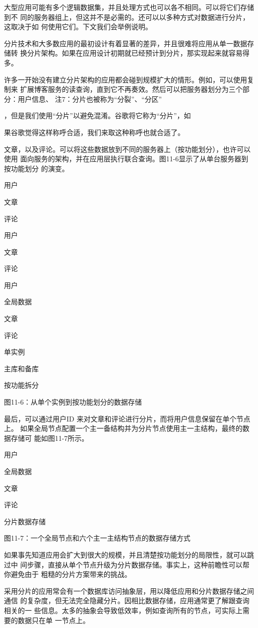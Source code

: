 大型应用可能有多个逻辑数据集，并且处理方式也可以各不相同。可以将它们存储到不
同的服务器组上，但这并不是必需的。还可以以多种方式对数据进行分片，这取决于如
何使用它们。下文我们会举例说明。

分片技术和大多数应用的最初设计有着显著的差异，并且很难将应用从单一数据存储转
换分片架构。如果在应用设计初期就已经预计到分片，那实现起来就容易得多。

许多一开始没有建立分片架构的应用都会碰到规模扩大的情形。例如，可以使用复制来
扩展博客服务的读查询，直到它不再奏效。然后可以把服务器划分为三个部分：用户信息、
注7：分片也被称为“分裂”、“分区”

，但是我们使用“分片”以避免混淆。谷歌将它称为“分片”，如

果谷歌觉得这样称呼合适，我们来取这种称呼也就合适了。

文章，以及评论。可以将这些数据放到不同的服务器上（按功能划分），也许可以使用
面向服务的架构，并在应用层执行联合查询。图11-6显示了从单台服务器到按功能划分
的演变。

用户

文章

评论

用户

文章

评论

用户

全局数据

文章

评论

单实例

主库和备库

按功能拆分

图11-6：从单个实例到按功能划分的数据存储

最后，可以通过用户ID 来对文章和评论进行分片，而将用户信息保留在单个节点上。
如果全局节点配置一个主一备结构并为分片节点使用主一主结构，最终的数据存储可
能如图11-7所示。

用户

全局数据

文章

评论

分片数据存储

图11-7：一个全局节点和六个主一主结构节点的数据存储方式

如果事先知道应用会扩大到很大的规模，并且清楚按功能划分的局限性，就可以跳过中
间步骤，直接从单个节点升级为分片数据存储。事实上，这种前瞻性可以帮你避免由于
粗糙的分片方案带来的挑战。

采用分片的应用常会有一个数据库访问抽象层，用以降低应用和分片数据存储之间通信
的复杂度，但无法完全隐藏分片。因相比数据存储，应用通常更了解跟查询相关的一
些信息。太多的抽象会导致低效率，例如查询所有的节点，可实际上需要的数据只在单
一节点上。

